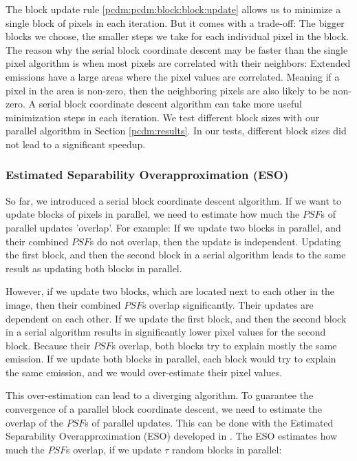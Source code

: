 The block update rule \eqref{pcdm:pcdm:block:block:update} allows us to minimize a single block of pixels in each iteration. But it comes with a trade-off: The bigger blocks we choose, the smaller steps we take for each individual pixel in the block. The reason why the serial block coordinate descent may be faster than the single pixel algorithm is when most pixels are correlated with their neighbors: Extended emissions have a large areas where the pixel values are correlated. Meaning if a pixel in the area is non-zero, then the neighboring pixels are also likely to be non-zero. A serial block coordinate descent algorithm can take more useful minimization steps in each iteration. We test different block sizes with our parallel algorithm in Section \ref{pcdm:results}. In our tests, different block sizes did not lead to a significant speedup.


\subsubsection{Estimated Separability Overapproximation (ESO)} \label{pcdm:pcdm:eso}
So far, we introduced a serial block coordinate descent algorithm. If we want to update blocks of pixels in parallel, we need to estimate how much the $PSF$s of parallel updates 'overlap'. For example: If we update two blocks in parallel, and their combined $PSF$s do not overlap, then the update is independent. Updating the first block, and then the second block in a serial algorithm leads to the same result as updating both blocks in parallel. 

However, if we update two blocks, which are located next to each other in the image, then their combined $PSF$s overlap significantly. Their updates are dependent on each other. If we update the first block, and then the second block in a serial algorithm results in significantly lower pixel values for the second block. Because their $PSF$s overlap, both blocks try to explain mostly the same emission. If we update both blocks in parallel, each block would try to explain the same emission, and we would over-estimate their pixel values.

This over-estimation can lead to a diverging algorithm. To guarantee the convergence of a parallel block coordinate descent, we need to estimate the overlap of the $PSF$s of parallel updates. This can be done with the Estimated Separability Overapproximation (ESO) developed in \cite{richtarik2016parallel}. The ESO estimates how much the $PSF$s overlap, if we update $\tau$ random blocks in parallel:

